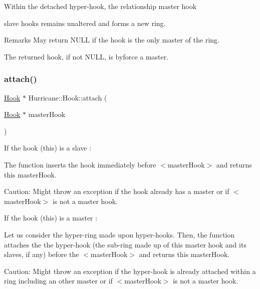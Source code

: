 Within the detached hyper-\/hook, the relationship master hook
\begin{DoxyItemize}
\item slave hooks remains unaltered and forms a new ring.
\end{DoxyItemize}

\begin{DoxyRemark}{Remarks}
May return N\+U\+LL if the hook is the only master of the ring.
\end{DoxyRemark}
The returned hook, if not N\+U\+LL, is byforce a master. \mbox{\label{classHurricane_1_1Hook_aacc4dacd0d128b35fd15546bc6dde3c3}} 
\subsubsection{\texorpdfstring{attach()}{attach()}}
{\footnotesize\ttfamily \hyperlink{classHurricane_1_1Hook}{Hook} $\ast$ Hurricane\+::\+Hook\+::attach (\begin{DoxyParamCaption}\item[{\hyperlink{classHurricane_1_1Hook}{Hook} $\ast$}]{master\+Hook }\end{DoxyParamCaption})}

If the hook (this) is a slave \+:

The function inserts the hook immediately before {\ttfamily $<$master\+Hook$>$} and returns this master\+Hook.

\begin{DoxyParagraph}{Caution\+:}
Might throw an exception if the hook already has a master or if {\ttfamily $<$master\+Hook$>$} is not a master hook.
\end{DoxyParagraph}
If the hook (this) is a master \+:

Let us consider the hyper-\/ring made upon hyper-\/hooks. Then, the function attaches the the hyper-\/hook (the sub-\/ring made up of this master hook and its slaves, if any) before the {\ttfamily $<$master\+Hook$>$} and returns this master\+Hook.

\begin{DoxyParagraph}{Caution\+:}
Might throw an exception if the hyper-\/hook is already attached within a ring including an other master or if {\ttfamily $<$master\+Hook$>$} is not a master hook. 
\end{DoxyParagraph}
\mbox{\label{classHurricane_1_1Hook_a7b98f0796a9080495472d574a23bcca0}} 
